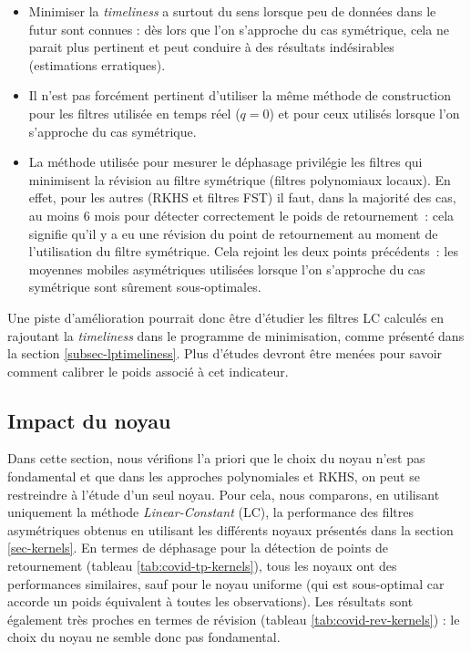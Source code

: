 \documentclass[
  11pt,
  french,
  a4paper]{article}
\newcommand\1{\mathds{1}}
\begin{document}
\begin{itemize}
\item
  Minimiser la \emph{timeliness} a surtout du sens lorsque peu de données dans le futur sont connues : dès lors que l'on s'approche du cas symétrique, cela ne parait plus pertinent et peut conduire à des résultats indésirables (estimations erratiques).
\item
  Il n'est pas forcément pertinent d'utiliser la même méthode de construction pour les filtres utilisée en temps réel (\(q=0\)) et pour ceux utilisés lorsque l'on s'approche du cas symétrique.
\item
  La méthode utilisée pour mesurer le déphasage privilégie les filtres qui minimisent la révision au filtre symétrique (filtres polynomiaux locaux).
  En effet, pour les autres (RKHS et filtres FST) il faut, dans la majorité des cas, au moins 6 mois pour détecter correctement le poids de retournement~: cela signifie qu'il y a eu une révision du point de retournement au moment de l'utilisation du filtre symétrique.
  Cela rejoint les deux points précédents~: les moyennes mobiles asymétriques utilisées lorsque l'on s'approche du cas symétrique sont sûrement sous-optimales.
\end{itemize}

Une piste d'amélioration pourrait donc être d'étudier les filtres LC calculés en rajoutant la \emph{timeliness} dans le programme de minimisation, comme présenté dans la section \ref{subsec-lptimeliness}.
Plus d'études devront être menées pour savoir comment calibrer le poids associé à cet indicateur.

\hypertarget{impact-du-noyau}{%
\subsection{Impact du noyau}\label{impact-du-noyau}}

Dans cette section, nous vérifions l'a priori que le choix du noyau n'est pas fondamental et que dans les approches polynomiales et RKHS, on peut se restreindre à l'étude d'un seul noyau.
Pour cela, nous comparons, en utilisant uniquement la méthode \emph{Linear-Constant} (LC), la performance des filtres asymétriques obtenus en utilisant les différents noyaux présentés dans la section \ref{sec-kernels}.
En termes de déphasage pour la détection de points de retournement (tableau \ref{tab:covid-tp-kernels}), tous les noyaux ont des performances similaires, sauf pour le noyau uniforme (qui est sous-optimal car accorde un poids équivalent à toutes les observations).
Les résultats sont également très proches en termes de révision (tableau \ref{tab:covid-rev-kernels}) : le choix du noyau ne semble donc pas fondamental.
\end{document}
